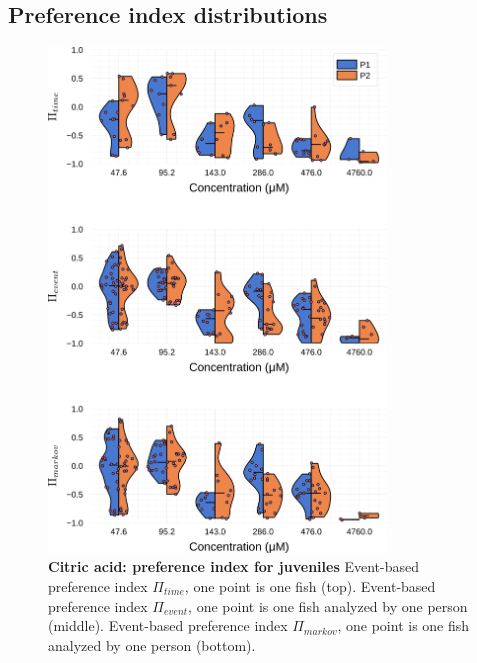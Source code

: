 \begin{appendices}
  \chapter{Preference index distributions}
    \begin{figure}[h]
      \centering
      \includegraphics[width=0.8\textwidth]{part_2/assets/dist_citricacid.png}
      \caption{\textbf{Citric acid: preference index for juveniles} Event-based preference index $\Pi_{time}$, one point is one fish (top). Event-based preference index $\Pi_{event}$, one point is one fish analyzed by one person (middle). Event-based preference index $\Pi_{markov}$, one point is one fish analyzed by one person (bottom).}
      \label{dist_citric_acid}
    \end{figure}
    \begin{figure}[h]
      \centering

\end{figure}
\end{appendices}
